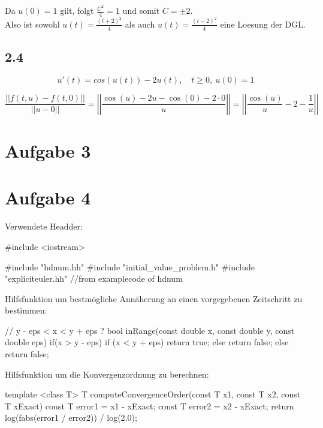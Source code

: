 \documentclass[10pt,oneside,a4paper]{scrartcl}
\begin{document}
		Da $u(0) = 1$ gilt, folgt $\frac{C^2}{4} = 1$ und somit $C=\pm 2$.\\
		Also ist sowohl $u(t) = \frac{(t+2)^2}{4}$ als auch  $u(t) = \frac{(t-2)^2}{4}$ eine Loesung der DGL.


 		\subsection*{2.4}

		\begin{equation*}
			u'(t) = cos(u(t)) - 2u(t),\quad t \geq 0, \ u(0) = 1
		\end{equation*}

		\begin{equation*}
			 \frac{||f(t,u) - f(t,0)||}{ ||u - 0|| } = \left | \left | \frac{\cos(u) - 2u - \cos(0) - 2 \cdot 0}{u} \right| \right| =  \left | \left | \frac{\cos(u)}{u} - 2 - \frac{1}{u} \right| \right|
		\end{equation*}

    \section*{Aufgabe 3}
    
    \section*{Aufgabe 4}

    Verwendete Headder:
        
\begin{cppcode}
#include <iostream>

#include "hdnum.hh"
#include "initial_value_problem.h"
#include "expliciteuler.hh"          //from examplecode of hdnum
    \end{cppcode}
    
    Hilfsfunktion um bestmögliche Annäherung an einen vorgegebenen Zeitschritt
    zu bestimmen:
    
    \begin{cppcode}
// y - eps < x < y + eps ?
bool inRange(const double x, const double y, const double eps) {
    if(x > y - eps) {
        if (x < y + eps) {
            return true;
        } else {
            return false;
        }
    } else {
        return false;
    }
}
    \end{cppcode}
    
    Hilfsfunktion um die Konvergenzordnung zu berechnen:
    
    \begin{cppcode}
template <class T>
T computeConvergenceOrder(const T x1, const T x2, const T xExact) {
  const T error1 = x1 - xExact;
  const T error2 = x2 - xExact;
  return log(fabs(error1 / error2)) / log(2.0);
}
    \end{cppcode}
    
\end{document}
